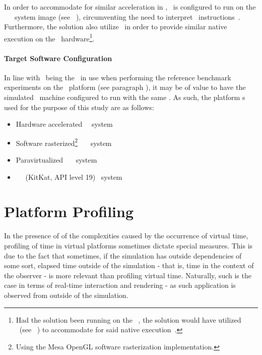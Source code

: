 In order to accommodate for similar acceleration in \dvttermqemu , \dvttermandroid\ is configured to run on the \dvttermintel\ \dvttermandroid\ \dvttermxeightysix\ system image (see ~), circumventing the need to interpret \dvttermarm\ instructions~.
Furthermore, the solution also utilize \dvttermkvm\ in order to provide similar native execution on the \dvttermhost\ hardware\footnote{Had the solution been running on the \dvttermwindows\ \dvttermos , the solution would have utilized \dvttermhaxm\ (see ~) to accommodate for said native execution~.}.

\paragraph{Target Software Configuration}
\label{par:experimentalmethodology_platformconfiguration_targetsoftwareconfiguration}
In line with \dvttermfedora\ being the \dvttermos\ in use when performing the reference benchmark experiments on the \dvttermhost\ platform (see paragraph ), it may be of value to have the simulated \dvttermtarget\ machine configured to run with the same \dvttermos .
As such, the platform \dvttermos s used for the purpose of this study are as follows:
\begin{itemize}[noitemsep]
	\item Hardware accelerated \dvttermfedora\ \dvttermhost\ system
	\item Software rasterized\footnote{Using the Mesa OpenGL software rasterization implementation.} \dvttermfedora\ \dvttermsimics\ \dvttermtarget\ system
	\item Paravirtualized \dvttermfedora\ \dvttermsimics\ \dvttermtarget\ system
	\item \dvttermqemu\ \dvttermandroid\  (KitKat, API level 19) \dvttermtarget\ system
\end{itemize}

\section{Platform Profiling}
\label{sec:experimentalmethodology_platformprofiling}
In the presence of of the complexities caused by the occurrence of virtual time, profiling of time in virtual platforms sometimes dictate special measures.
This is due to the fact that sometimes, if the simulation has outside dependencies of some sort, elapsed time outside of the simulation - that is, time in the context of the observer - is more relevant than profiling virtual time.
Naturally, such is the case in terms of real-time interaction and rendering - as such application is observed from outside of the simulation.

